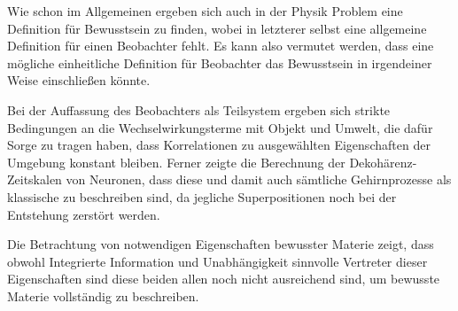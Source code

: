 
Wie schon im Allgemeinen ergeben sich auch in der Physik Problem eine Definition für Bewusstsein zu finden,
wobei in letzterer selbst eine allgemeine Definition für einen Beobachter fehlt. Es kann also vermutet werden,
dass eine mögliche einheitliche Definition für Beobachter das Bewusstsein in irgendeiner Weise einschließen 
könnte.

Bei der Auffassung des Beobachters als Teilsystem ergeben sich strikte Bedingungen an die Wechselwirkungsterme
mit Objekt und Umwelt, die dafür Sorge zu tragen haben, dass Korrelationen zu ausgewählten Eigenschaften der
Umgebung konstant bleiben. 
Ferner zeigte die Berechnung der Dekohärenz-Zeitskalen von Neuronen, dass diese und damit auch sämtliche Gehirnprozesse
als klassische zu beschreiben sind, da jegliche Superpositionen noch bei der Entstehung zerstört werden.

Die Betrachtung von notwendigen Eigenschaften bewusster Materie zeigt, dass obwohl Integrierte Information
und Unabhängigkeit sinnvolle Vertreter dieser Eigenschaften sind diese beiden allen noch nicht ausreichend
sind, um bewusste Materie vollständig zu beschreiben. 


